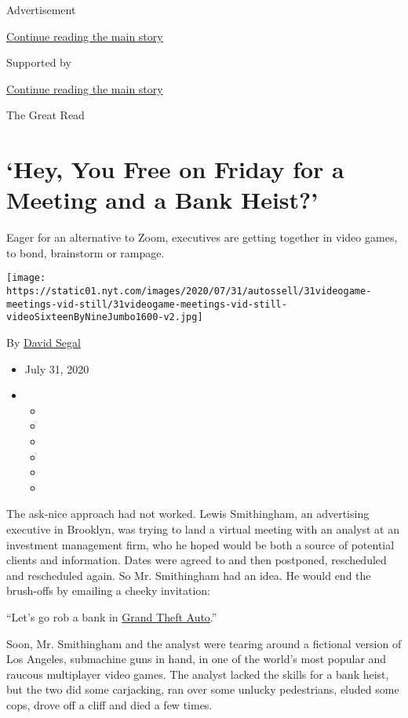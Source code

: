 Advertisement

\protect\hyperlink{after-top}{Continue reading the main story}

Supported by

\protect\hyperlink{after-sponsor}{Continue reading the main story}

The Great Read

\hypertarget{hey-you-free-on-friday-for-a-meeting-and-a-bank-heist}{%
\section{`Hey, You Free on Friday for a Meeting and a Bank
Heist?'}\label{hey-you-free-on-friday-for-a-meeting-and-a-bank-heist}}

Eager for an alternative to Zoom, executives are getting together in
video games, to bond, brainstorm or rampage.

\texttt{[image: https://static01.nyt.com/images/2020/07/31/autossell/31videogame-meetings-vid-still/31videogame-meetings-vid-still-videoSixteenByNineJumbo1600-v2.jpg]}

By \href{https://www.nytimes.com/by/david-segal}{David Segal}

\begin{itemize}
\item
  July 31, 2020
\item
  \begin{itemize}
  \item
  \item
  \item
  \item
  \item
  \item
  \end{itemize}
\end{itemize}

The ask-nice approach had not worked. Lewis Smithingham, an advertising
executive in Brooklyn, was trying to land a virtual meeting with an
analyst at an investment management firm, who he hoped would be both a
source of potential clients and information. Dates were agreed to and
then postponed, rescheduled and rescheduled again. So Mr. Smithingham
had an idea. He would end the brush-offs by emailing a cheeky
invitation:

``Let's go rob a bank in
\href{https://www.nytimes.com/2013/09/17/arts/video-games/grand-theft-auto-v-is-a-return-to-the-comedy-of-violence.html}{Grand
Theft Auto}.''

Soon, Mr. Smithingham and the analyst were tearing around a fictional
version of Los Angeles, submachine guns in hand, in one of the world's
most popular and raucous multiplayer video games. The analyst lacked the
skills for a bank heist, but the two did some carjacking, ran over some
unlucky pedestrians, eluded some cops, drove off a cliff and died a few
times.

